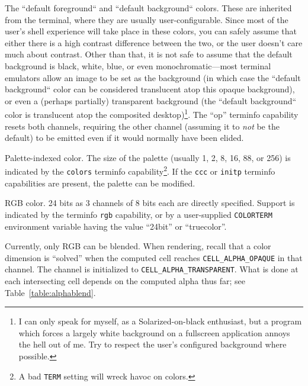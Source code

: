\begin{denseitemize}
\item{The ``default foreground`` and ``default background`` colors. These are
    inherited from the terminal, where they are usually user-configurable.
    Since most of the user's shell experience will take place in these colors,
    you can safely assume that either there is a high contrast difference
    between the two, or the user doesn't care much about contrast. Other than
    that, it is not safe to assume that the default background is black, white,
    blue, or even monochromatic---most terminal emulators allow an image to be
    set as the background (in which case the ``default background`` color can
    be considered translucent atop this opaque background), or even a (perhaps
    partially) transparent background (the ``default background`` color is
    translucent atop the composited desktop)\footnote{I can only speak for myself, as a Solarized-on-black enthusiast, but a
    program which forces a largely white background on a fullscreen application
    annoys the hell out of me. Try to respect the user's configured background
    where possible.}. The ``op'' terminfo capability resets
    both channels, requiring the other channel (assuming it to \textit{not} be
    the default) to be emitted even if it would normally have been elided.}
\item{Palette-indexed color. The size of the palette (usually 1, 2, 8, 16, 88,
    or 256) is indicated by the \texttt{colors} terminfo capability\footnote{A
    bad \texttt{TERM} setting will wreck havoc on colors.}. If the
    \texttt{ccc} or \texttt{initp} terminfo capabilities are present, the palette
    can be modified.}
\item{RGB color. 24 bits as 3 channels of 8 bits each are directly specified. Support
    is indicated by the terminfo \texttt{rgb} capability, or by a user-supplied
    \texttt{COLORTERM} environment variable having the value ``24bit'' or ``truecolor''.}
\end{denseitemize}

Currently, only RGB can be blended. When rendering, recall that a color dimension
is ``solved'' when the computed cell reaches \texttt{CELL\_ALPHA\_OPAQUE} in that channel.
The channel is initialized to \texttt{CELL\_ALPHA\_TRANSPARENT}. What is done at each
intersecting cell depends on the computed alpha thus far; see Table~\ref{table:alphablend}.

